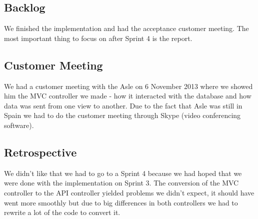\subsection{Backlog}
We finished the implementation and had the acceptance customer meeting.
The most important thing to focus on after Sprint 4 is the report.


\subsection{Customer Meeting}
We had a customer meeting with the Asle on 6 November 2013 where we showed him the MVC controller we made - how it interacted with the database and how data was sent from one view to another. Due to the fact that Asle was still in Spain we had to do the customer meeting through Skype (video conferencing software).

\subsection{Retrospective}
We didn't like that we had to go to a Sprint 4 because we had hoped that we were done with the implementation on Sprint 3. The conversion of the MVC controller to the API controller yielded problems we didn't expect, it should have went more smoothly but due to big differences in both controllers we had to rewrite a lot of the code to convert it. 